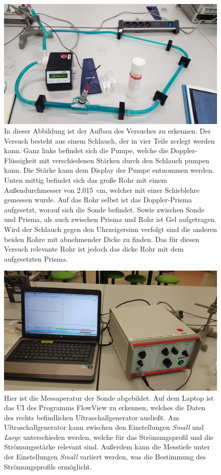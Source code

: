 \begin{figure}[H]
    \centering
    \includegraphics[width=0.75\linewidth]{images/Schlauch.jpg}
    \caption{In dieser Abbildung ist der Aufbau des Versuches zu erkennen. Der Versuch besteht aus einem Schlauch, der in vier Teile zerlegt werden kann. Ganz links befindet sich die 
    Pumpe, welche die Doppler-Flüssigkeit mit verschiedenen Stärken durch den Schlauch pumpen kann. Die Stärke kann dem Display der Pumpe entnommen werden. Unten mittig befindet sich
    das große Rohr mit einem Außendurchmesser von \SI{2.015}{\centi\meter}, welcher mit einer Schieblehre gemessen wurde. Auf das Rohr selbst ist das 
    Doppler-Prisma aufgesetzt, worauf sich die Sonde befindet. Sowie zwischen Sonde und Prisma, als auch zwischen Prisma und Rohr ist Gel aufgetragen. Wird der Schlauch gegen den 
    Uhrzeigersinn verfolgt sind die anderen beiden Rohre mit abnehmender Dicke zu finden. Das für diesen Versuch relevante Rohr ist jedoch das dicke Rohr mit dem aufgesetzten Prisma.}
    \label{fig:3}
\end{figure}
\begin{figure}[H]
    \centering
    \includegraphics[width=0.75\linewidth]{images/Messaperatur.jpg}
    \caption{Hier ist die Messaperatur der Sonde abgebildet. Auf dem Laptop ist das UI des Programms FlowView zu erkennen, welches die Daten des rechts befindlichen Ultraschallgenerator 
    ausließt. Am Ultraschallgenerator kann zwischen den Einstellungen \textit{Small} und \textit{Large} unterschieden werden, welche für das Strömungsprofil und die Strömungsstärke relevant sind.
    Außerdem kann die Messtiefe unter der Einstellungen \textit{Small} variiert werden, was die Bestimmung des Strömungsprofils ermöglicht.}
    \label{fig:4}
\end{figure}

